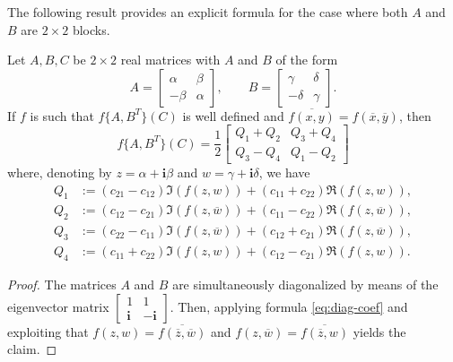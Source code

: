 \documentclass{siamart1116}
\begin{document}
The following result provides an explicit formula for the 
case where both $A$ and $B$ are $2 \times 2$ blocks. 


\begin{theorem}
	Let $A,B,C$ be $2\times 2$ real matrices with $A$ and $B$ of the form
	\[
	A=\begin{bmatrix}
	\alpha&\beta\\
	-\beta&\alpha
	\end{bmatrix},\qquad
		B=\begin{bmatrix}
	\gamma&\delta\\
	-\delta&\gamma
	\end{bmatrix}.
	\]
	If $f$ is such that $f\{A,B^T\}(C)$ is well defined and $\overline{f(x,y)}= f(\overline x,\overline y)$, then
	\[f\{A,B^T\}(C)=\frac12\begin{bmatrix} Q_1+Q_2& Q_3+Q_4\\
	Q_3-Q_4&Q_1-Q_2\end{bmatrix}\]
	where, denoting by $z=\alpha+\mathbf i \beta$ and $w=\gamma+\mathbf i\delta$, we have
	\begin{align*}
	Q_1&:= (c_{21}-c_{12})\Im(f(z,w)) + (c_{11}+c_{22})\Re(f(z,w)),\\
	Q_2&:= (c_{12}-c_{21})\Im(f(z,\overline w)) + (c_{11}-c_{22})\Re(f(z,\overline w)),\\
		Q_3&:= (c_{22}-c_{11})\Im(f(z,\overline w)) + (c_{12}+c_{21})\Re(f(z,\overline w)),\\
			Q_4&:= (c_{11}+c_{22})\Im(f(z,w)) + (c_{12}-c_{21})\Re(f(z,w)).	
	\end{align*}
\end{theorem} 
\begin{proof}
The matrices $A$ and $B$ are simultaneously diagonalized by means of the eigenvector matrix $\left[\begin{smallmatrix}
	1&1\\ \mathbf i&-\mathbf i
	\end{smallmatrix}\right]$. Then, applying formula \eqref{eq:diag-coef} and exploiting that $f(z,w)=\overline{f(\overline z,\overline w)}$ and $f(z,\overline w)=\overline{f(\overline z,w)}$ yields the claim.
	\end{proof}
\end{document}
